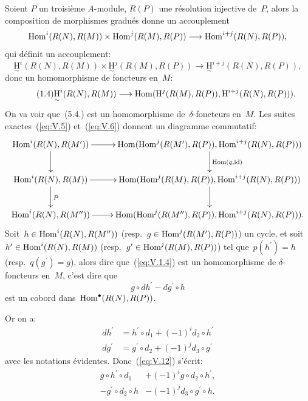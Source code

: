 Soient $P$ un troisi\`eme $A$-module, $R(P)$ une r\'esolution injective de~$P$, alors la composition de morphismes gradu\'es donne un accouplement
\begin{equation} \label{eq:V.10} \Hom^{i}(R(N), R(M))\times\Hom^{j}(R(M), R(P))\to\Hom^{i+j}(R(N), R(P)),
\end{equation}
qui d\'efinit un accouplement:
\begin{equation} \label{eq:V.11} \underset{\sim}{\mathrm{H}}^{i}(R(N), R(M))\times\underset{\sim}{\mathrm{H}}^{j}(R(M), R(P))\to\underset{\sim}{\mathrm{H}}^{i+j}(R(N), R(P)),
\end{equation}
donc un homomorphisme de foncteurs en~$M$:
\begin{equation*} \label{eq:V.1.4} \tag{1.4} \underset{\sim}{\mathrm{H}}^{i}(R(N), R(M))\to\Hom(\H^{j}(R(M), R(P)), \H^{i+j}(R(N), R(P))).
\end{equation*}
On va voir que~(5.4.) est un homomorphisme de~$\delta$-foncteurs en~$M$. Les suites exactes~(\ref{eq:V.5}) et~(\ref{eq:V.6}) donnent un diagramme commutatif:
$$
\xymatrix{ \Hom^{i}(R(N), R(M^{\prime}))\ar[r]\ar[d] & \Hom(\Hom^{j}(R(M^{\prime}), R(P)), \Hom^{i+j}(R(N), R(P)))\ar[d]^{\Hom(q, \id)}\\
\Hom^{i}(R(N), R(M))\ar[r]\ar[d]^{P} & \Hom(\Hom^{j}(R(M), R(P)), \Hom^{i+j}(R(N), R(P)))\ar[d]\\
\Hom^{i}(R(N), R(M^{\prime\prime}))\ar[r] & \Hom(\Hom^{j}(R(M^{\prime\prime}), R(P)), \Hom^{i+j}(R(N), R(P))).}$$
Soit~$h\in\operatorname{Hom}^{i}(R(N), R(M^{\prime\prime}))$ (resp.\ $g\in\operatorname{Hom}^{j}(R(M^{\prime}), R(P))$) un cycle, et soit $h^{\prime}\in\operatorname{Hom}^{i}(R(N), R(M))$ (resp.\ $g^{\prime}\in\operatorname{Hom}^{j}(R(M), R(P))$) tel que~$p(h^{\prime})=h$ (resp.\ $q(g^{\prime})=g$), alors dire que~(\ref{eq:V.1.4}) est un homomorphisme de $\delta$-foncteurs en~$M$, c'est dire que
\begin{equation} \label{eq:V.12}
g\circ dh^{\prime}-dg^{\prime}\circ h
\end{equation}
est un cobord dans~$\operatorname{Hom}^{\bullet}(R(N), R(P))$.

Or on a:
\begin{align*}
dh^{\prime} &= h^{\prime}\circ d_{1}+(-1)^{i}d_{2}\circ h^{\prime}\\
dg^{\prime} &= g^{\prime}\circ d_{2}+(-1)^{j}d_{3}\circ g^{\prime}
\end{align*}
avec les notations \'evidentes. Donc~(\ref{eq:V.12}) s'\'ecrit: \begin{align*} g\circ h^{\prime}\circ d_{1} &+ (-1)^{i}g\circ d_{2}\circ h^{\prime}, \\
-g^{\prime}\circ d_{2}\circ h &- (-1)^{j}d_{3}\circ g^{\prime}\circ h.
\end{align*}

